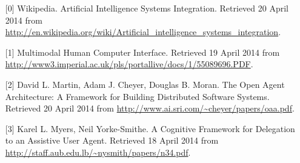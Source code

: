 \documentclass[14pt]{article} %
\begin{document}
\begin{itemize}

\item[] [0] Wikipedia. Artificial Intelligence Systems Integration. Retrieved 20 April 2014 from \url{http://en.wikipedia.org/wiki/Artificial_intelligence_systems_integration}.

\item[] [1] Multimodal Human Computer Interface. Retrieved 19 April 2014 from \url{http://www3.imperial.ac.uk/pls/portallive/docs/1/55089696.PDF}.

\item[] [2] David L. Martin, Adam J. Cheyer, Douglas B. Moran. The Open Agent Architecture: A Framework for Building Distributed Software Systems. Retrieved 20 April 2014 from \url{http://www.ai.sri.com/~cheyer/papers/oaa.pdf}.

\item[] [3] Karel L. Myers, Neil Yorke-Smithe. A Cognitive Framework for Delegation to an Assistive User Agent. Retrieved 18 April 2014 from \url{http://staff.aub.edu.lb/~nysmith/papers/n34.pdf}.

\end{itemize}
\end{document}
